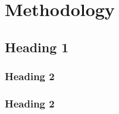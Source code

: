 \chapter[Methodology]{Methodology}
\label{Chap:Methodology}




\section{Heading 1}

\subsection{Heading 2}
\lipsum[4] %

\subsection{Heading 2}
\lipsum[4]


